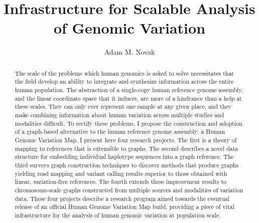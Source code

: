 
\title{Infrastructure for Scalable Analysis of Genomic Variation}
\author{Adam M. Novak}
\deanlinethree{}

\begin{frontmatter}

\maketitle
\copyrightpage

\tableofcontents
\listoffigures
\listoftables
\listofalgorithms
{}

\begin{abstract}
The scale of the problems which human genomics is asked to solve necessitates that the field develop an ability to integrate and synthesize information across the entire human population. The abstraction of a single-copy human reference genome assembly, and the linear coordinate space that it induces, are more of a hindrance than a help at these scales. They can only ever represent one sample at any given place, and they make combining information about human variation across multiple studies and modalities difficult. To rectify these problems, I propose the construction and adoption of a graph-based alternative to the human reference genome assembly: a Human Genome Variation Map. I present here four research projects. The first is a theory of mapping to references that is extensible to graphs. The second describes a novel data structure for embedding individual haplotype sequences into a graph reference. The third surveys graph construction techniques to discover methods that produce graphs yielding read mapping and variant calling results superior to those obtained with linear, variation-free references. The fourth extends these improvement results to chromosome-scale graphs constructed from multiple sources and modalities of variation data. These four projects describe a research program aimed towards the eventual release of an official Human Genome Variation Map build, providing a piece of vital infrastructure for the analysis of human genomic variation at population scale.
\end{abstract}


\end{frontmatter}
